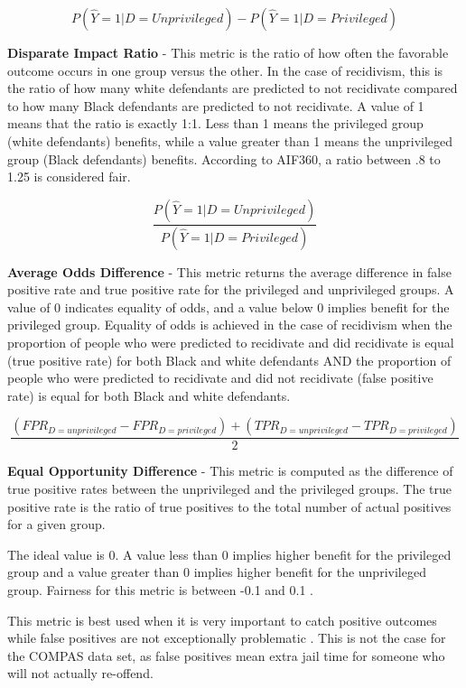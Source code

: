 \documentclass[water,article,submit,moreauthors,pdftex]{mdpi}
\begin{document}
\[P(\hat{Y}=1|D=Unprivileged) - P(\hat{Y}=1|D=Privileged)\]

\textbf{Disparate Impact Ratio} - This metric is the ratio of how often
the favorable outcome occurs in one group versus the other. In the case
of recidivism, this is the ratio of how many white defendants are
predicted to not recidivate compared to how many Black defendants are
predicted to not recidivate. A value of 1 means that the ratio is
exactly 1:1. Less than 1 means the privileged group (white defendants)
benefits, while a value greater than 1 means the unprivileged group
(Black defendants) benefits. According to AIF360, a ratio between .8 to
1.25 is considered fair\citep{Ronaghan2019AI}.

\[\frac{P(\hat{Y}=1|D=Unprivileged)}{P(\hat{Y}=1|D=Privileged)}\]

\textbf{Average Odds Difference} - This metric returns the average
difference in false positive rate and true positive rate for the
privileged and unprivileged groups. A value of 0 indicates equality of
odds, and a value below 0 implies benefit for the privileged group.
Equality of odds is achieved in the case of recidivism when the
proportion of people who were predicted to recidivate and did recidivate
is equal (true positive rate) for both Black and white defendants AND
the proportion of people who were predicted to recidivate and did not
recidivate (false positive rate) is equal for both Black and white
defendants\citep{aif360-oct-2018}.

\[\frac{(FPR_{D = unprivileged} - FPR_{D = privileged}) + (TPR_{D = unprivileged} - TPR_{D = privileged})}{2}\]

\textbf{Equal Opportunity Difference} - This metric is computed as the
difference of true positive rates between the unprivileged and the
privileged groups. The true positive rate is the ratio of true positives
to the total number of actual positives for a given
group\citep{GoogleDev}.

The ideal value is 0. A value less than 0 implies higher benefit for the
privileged group and a value greater than 0 implies higher benefit for
the unprivileged group. Fairness for this metric is between -0.1 and 0.1
\citep{aif360-oct-2018}.

This metric is best used when it is very important to catch positive
outcomes while false positives are not exceptionally problematic
\citep{Cortez2019How}. This is not the case for the COMPAS data set, as
false positives mean extra jail time for someone who will not actually
re-offend.
\end{document}
